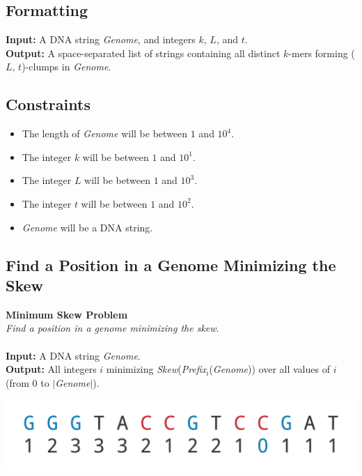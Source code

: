 \documentclass{article}
\begin{document}
\subsection*{Formatting}
\textbf{Input:} A DNA string \emph{Genome}, and integers $k$, $L$, and $t$.\\
\noindent \textbf{Output:} A space-separated list of strings containing all distinct $k$-mers forming ($L$, $t$)-clumps in \emph{Genome}.

\subsection*{Constraints}
\begin{itemize}
    \item The length of \emph{Genome} will be between $1$ and $10^4$.
    \item The integer $k$ will be between $1$ and $10^1$.
    \item The integer $L$ will be between $1$ and $10^3$.
    \item The integer $t$ will be between $1$ and $10^2$.
    \item \emph{Genome} will be a DNA string.
\end{itemize}
\pagebreak
\subsection{Find a Position in a Genome Minimizing the Skew}
\hline\vspace{5}
\noindent \textbf{Minimum Skew Problem}\\
\emph{Find a position in a genome minimizing the skew}.\\ \\
\textbf{Input:} A DNA string \emph{Genome}.\\
\textbf{Output:} All integers $i$ minimizing \emph{Skew}(\emph{Prefix}$_i$(\emph{Genome})) over all values of $i$ (from 0 to $|$\emph{Genome}$|$).
\begin{center}
    \includegraphics[scale=0.2]{c1/logos/1F.png} 
\end{center}
\hline\vspace{5}
\end{document}
